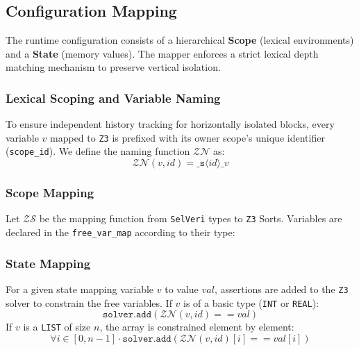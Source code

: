 \documentclass{article}
\begin{document}
\newpage
\subsection{Configuration Mapping}
The runtime configuration consists of a hierarchical \textbf{Scope} (lexical environments) and a \textbf{State} (memory values). The mapper enforces a strict lexical depth matching mechanism to preserve vertical isolation.

\subsubsection{Lexical Scoping and Variable Naming}
To ensure independent history tracking for horizontally isolated blocks, every variable $v$ mapped to \texttt{Z3} is prefixed with its owner scope's unique identifier (\texttt{scope\_id}). We define the naming function $\mathcal{ZN}$ as:
\[
\mathcal{ZN}(v, id) = \texttt{\_s}\langle id \rangle\texttt{\_}v
\]


\subsubsection{Scope Mapping}
Let $\mathcal{ZS}$ be the mapping function from \texttt{SelVeri} types to \texttt{Z3} Sorts. Variables are declared in the \texttt{free\_var\_map} according to their type:

\begin{table}[h!]
\centering
\renewcommand{\arraystretch}{1.5} 
\end{table}

\subsubsection{State Mapping}
For a given state mapping variable $v$ to value $val$, assertions are added to the \texttt{Z3} solver to constrain the free variables. 
If $v$ is of a basic type (\texttt{INT} or \texttt{REAL}):
\[
\texttt{solver.add}( \mathcal{ZN}(v, id) == val )
\]
If $v$ is a \texttt{LIST} of size $n$, the array is constrained element by element:
\[
\forall i \in [0, n-1] \cdot \texttt{solver.add}( \mathcal{ZN}(v, id)[i] == val[i] )
\]
\end{document}
